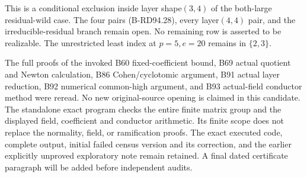 \begin{remark}
\label{rem:B-RD94-scope}
This is a conditional exclusion inside layer shape$(3,4)$ of the
both-large residual-wild case. The four pairs (B-RD94.28), every
layer$(4,4)$ pair, and the irreducible-residual branch remain open.
No remaining row is asserted to be realizable. The unrestricted
least index at $p=5,e=20$ remains in $\{2,3\}$.

The full proofs of the invoked B60 fixed-coefficient bound, B69
actual quotient and Newton calculation, B86 Cohen/cyclotomic
argument, B91 actual layer reduction, B92 numerical common-high
argument, and B93 actual-field conductor method were reread.
No new original-source opening is claimed in this candidate.
The standalone exact program
checks the entire finite matrix group and the displayed field,
coefficient and conductor arithmetic. Its finite scope does not
replace the normality, field, or ramification proofs. The exact
executed code, complete output, initial failed census version and
its correction, and the earlier explicitly unproved exploratory
note remain retained. A final dated certificate paragraph will be
added before independent audits.
\end{remark}
